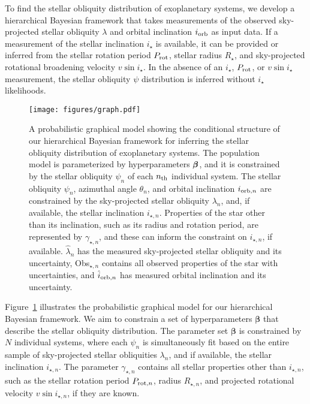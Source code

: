 \documentclass[twocolumn,times]{aastex631}
\begin{document}
To find the stellar obliquity distribution of exoplanetary systems, we develop a hierarchical Bayesian framework that takes measurements of the observed sky-projected stellar obliquity $\lambda$ and orbital inclination $i_{\rm orb}$ as input data.
If a measurement of the stellar inclination $i_\star$ is available, it can be provided or inferred from the stellar rotation period $P_{\rm rot}$, stellar radius $R_\star$, and sky-projected rotational broadening velocity $v\sin{i}_\star$.
In the absence of an $i_\star$, $P_{\rm rot}$, or $v\sin{i}_\star$ measurement, the stellar obliquity $\psi$ distribution is inferred without $i_\star$ likelihoods.

\begin{figure}[ht!]
    \centering
    \texttt{[image: figures/graph.pdf]}
    \caption{A probabilistic graphical model showing the conditional structure of our hierarchical Bayesian framework for inferring the stellar obliquity distribution of exoplanetary systems. The population model is parameterized by hyperparameters $\vb*{\beta}$, and it is constrained by the stellar obliquity $\psi_n$ of each $n_{\rm th}$ individual system. The stellar obliquity $\psi_n$, azimuthal angle $\theta_n$, and orbital inclination $i_{{\rm orb}, n}$ are constrained by the sky-projected stellar obliquity $\lambda_n$, and, if available, the stellar inclination $i_{\star, n}$.
    Properties of the star other than its inclination, such as its radius and rotation period, are represented by $\gamma_{\star, n}$, and these can inform the constraint on $i_{\star, n}$, if available. 
    $\hat{\lambda}_n$ has the measured sky-projected stellar obliquity and its uncertainty, Obs$_{\star,n}$ contains all observed properties of the star with uncertainties, and $\hat{i}_{{\rm orb}, n}$ has measured orbital inclination and its uncertainty.}
    \label{fig:graph}
\end{figure}

Figure~\ref{fig:graph} illustrates the probabilistic graphical model for our hierarchical Bayesian framework. We aim to constrain a set of hyperparameters $\bm{\beta}$ that describe the stellar obliquity distribution. The parameter set $\bm{\beta}$ is constrained by $N$ individual systems, where each $\psi_n$ is simultaneously fit based on the entire sample of sky-projected stellar obliquities $\lambda_n$, and if available, the stellar inclination $i_{\star, n}$. 
The parameter $\gamma_{\star, n}$ contains all stellar properties other than $i_{\star,n}$, such as the stellar rotation period $P_{{\rm rot},n}$, radius $R_{\star,n}$, and projected rotational velocity $v\sin{i_{\star,n}}$, if they are known.
\end{document}
